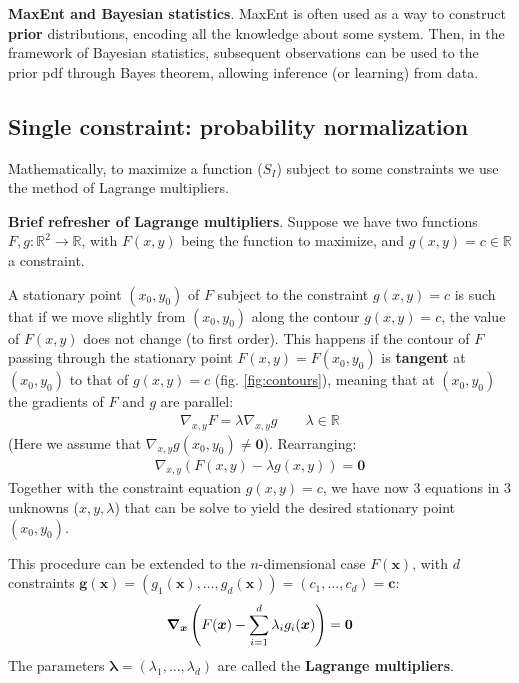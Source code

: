 \documentclass[../../main.tex]{subfiles}
\begin{document}
\begin{appr}\textbf{MaxEnt and Bayesian statistics}. MaxEnt is often used as a way to construct \textbf{prior} distributions, encoding all the  knowledge about some system. Then, in the framework of Bayesian statistics, subsequent observations can be used to  the prior pdf through Bayes theorem, allowing inference (or learning) from data.  
\end{appr}

\subsection{Single constraint: probability normalization}
Mathematically, to maximize a function ($S_I$) subject to some constraints we use the method of Lagrange multipliers.

\begin{expl}\textbf{Brief refresher of Lagrange multipliers}. Suppose we have two functions $F, g\colon \mathbb{R}^2 \to \mathbb{R}$, with $F(x,y)$ being the function to maximize, and $g(x,y) = c \in \mathbb{R}$ a constraint. 
    
A stationary point $(x_0,y_0)$ of $F$ subject to the constraint $g(x,y) = c$ is such that if we move slightly from $(x_0,y_0)$ along the contour $g(x,y) = c$, the value of $F(x,y)$ does not change (to first order). This happens if the contour of $F$ passing through the stationary point $F(x,y) = F(x_0, y_0)$ is \textbf{tangent} at $(x_0,y_0)$ to that of $g(x,y) = c$ (fig. \ref{fig:contours}), meaning that at $(x_0, y_0)$ the gradients of $F$ and $g$ are parallel:
    \begin{align*}
        \nabla_{x,y} F = \lambda \nabla_{{x,y}} g \qquad \lambda \in \mathbb{R}
    \end{align*}
    (Here we assume that $\nabla_{x,y} g (x_0,y_0) \neq \bm{0}$). Rearranging:
    \begin{align*}
        \nabla_{x,y} (F(x,y) - \lambda g(x,y)) = \bm{0}
    \end{align*}
    Together with the constraint equation $g(x,y) = c$, we have now $3$ equations in $3$ unknowns ($x,y,\lambda$) that can be solve to yield the desired stationary point $(x_0, y_0)$.

    \medskip

    This procedure can be extended to the $n$-dimensional case $F(\bm{x})$, with $d$ constraints $\bm{g}(\bm{x}) = (g_1(\bm{x}), \dots, g_d(\bm{x})) = (c_1,\dots,c_d) = \bm{c}$:
    \begin{align*}
        \grad_{\bm{x}} \left(F(\bm{x}) - \sum_{i=1}^d \lambda_i g_i(\bm{x})\right) = \bm{0}
    \end{align*}
    The parameters $\bm{\lambda} = (\lambda_1, \dots, \lambda_d)$ are called the \textbf{Lagrange multipliers}.  
\end{expl}
\end{document}
